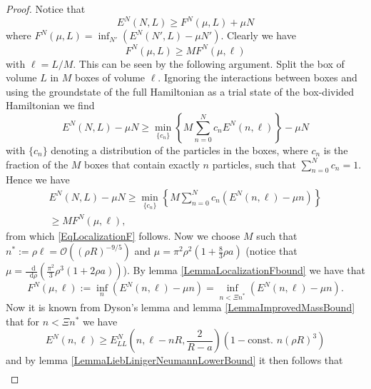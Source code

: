 \documentclass[a4paper,11pt]{article}
\newcommand*\diff{\mathop{}\!\mathrm{d}}
\numberwithin{equation}{section}
\begin{document}
	\begin{proof}
		Notice that \begin{equation}
		E^N(N,L)\geq F^N(\mu,L)+\mu N
		\end{equation}
		where $ F^N(\mu,L)=\inf_{N'}\left(E^N(N',L)-\mu N'\right) $. Clearly we have \begin{equation}
		F^N(\mu,L)\geq M F^N(\mu,\ell)\label{EqLocalizationF}
		\end{equation}
		with $ \ell=L/M $. This can be seen by the following argument. Split the box of volume $ L $ in $ M $ boxes of volume $ \ell $. Ignoring the interactions between boxes and using the groundstate of the full Hamiltonian as a trial state of the box-divided Hamiltonian we find\begin{equation}
		E^N(N,L)-\mu N\geq \min_{\{c_n\}}\left\{M\sum_{n=0}^{N}c_n E^N(n,\ell)\right\}-\mu N
		\end{equation}
		with $ \{c_n\} $ denoting a distribution of the particles in the boxes, where $ c_n $ is the fraction of the $ M $ boxes that contain exactly $ n $ particles, such that $ \sum_{n=0}^{N}c_n=1 $. Hence we have \begin{equation}
	\begin{aligned}
		E^N(N,L)-\mu N\geq\min_{\{c_n\}}\left\{M\sum_{n=0}^{N}c_n \left(E^N(n,\ell)-\mu n\right)\right\}\\
		\geq MF^{N}(\mu,\ell),
	\end{aligned}
		\end{equation}
		from which \eqref{EqLocalizationF} follows. Now we choose $ M $ such that $ n^*:=\rho\ell=\mathcal{O}\left(\left(\rho R\right)^{-9/5}\right) $ and $ \mu=\pi^2\rho^2\left(1+\frac{8}{3}\rho a\right) $ (notice that $ \mu=\frac{\diff}{\diff \rho}(\frac{\pi^2}{3}\rho^3(1+2\rho a))$). By lemma \ref{LemmaLocalizationFbound} we have that \begin{equation}
		F^N(\mu,\ell):=\inf_{n}\left(E^N(n,\ell)-\mu n\right)=\inf_{n<\Xi n^*}\left(E^N(n,\ell)-\mu n\right).
		\end{equation}
		Now it is known from Dyson's lemma and lemma \ref{LemmaImprovedMassBound} that for $ n<\Xi n^* $ we have \begin{equation}
		E^{N}(n,\ell)\geq E^N_{LL}\left(n,\ell-nR,\frac{2}{R-a}\right)\left(1-\text{const. }n(\rho R)^{3}\right)
		\end{equation}
		and by lemma \ref{LemmaLiebLinigerNeumannLowerBound} it then follows that \begin{equation}
		\begin{aligned}

\end{aligned}
\end{equation}
\end{proof}
\end{document}
